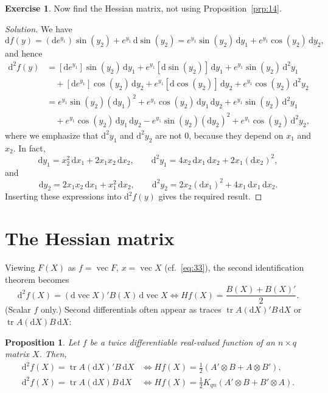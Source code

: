 \documentclass[14pt]{extarticle}
\theoremstyle{plain}
\newtheorem{proposition}{Proposition}
\theoremstyle{definition}
\newtheorem{exercise}{Exercise}
\theoremstyle{remark}
\newenvironment{solution}{%
  \begin{proof}[Solution]%
}{%
  \end{proof}%
}
\DeclareMathOperator{\tr}{tr}
\DeclareMathOperator{\avec}{vec}
\newcommand{\dd}{\mathrm{d}}
\begin{document}
\begin{exercise}\label{exer:27}
Now find the Hessian matrix, not using Proposition~\ref{prp:14}.
\end{exercise}

\begin{solution}
We have
\[
\dd f(y) = (\dd e^{y_1})\sin(y_2) + e^{y_1}\, \dd\sin(y_2) = e^{y_1}\sin(y_2)\, \dd y_1 + e^{y_1}\cos(y_2)\, \dd y_2,
\]
and hence
\begin{align*}
\dd^2 f(y) &= [\dd e^{y_1}]\sin(y_2)\, \dd y_1 + e^{y_1}[\dd\sin(y_2)]\, \dd y_1 + e^{y_1}\sin(y_2)\, \dd^2 y_1 \\
&\quad + [\dd e^{y_1}]\cos(y_2)\, \dd y_2 + e^{y_1}[\dd\cos(y_2)]\, \dd y_2 + e^{y_1}\cos(y_2)\, \dd^2 y_2 \\
&= e^{y_1}\sin(y_2)(\dd y_1)^2 + e^{y_1}\cos(y_2)\, \dd y_1\, \dd y_2 + e^{y_1}\sin(y_2)\, \dd^2 y_1 \\
&\quad + e^{y_1}\cos(y_2)\, \dd y_1\, \dd y_2 - e^{y_1}\sin(y_2)(\dd y_2)^2 + e^{y_1}\cos(y_2)\, \dd^2 y_2,
\end{align*}
where we emphasize that $\dd^2 y_1$ and $\dd^2 y_2$ are not $0$, because they depend on $x_1$ and $x_2$. In fact,
\[
\dd y_1 = x_2^2\, \dd x_1 + 2x_1 x_2\, \dd x_2, \qquad \dd^2 y_1 = 4x_2\, \dd x_1\, \dd x_2 + 2x_1(\dd x_2)^2,
\]
and
\[
\dd y_2 = 2x_1 x_2\, \dd x_1 + x_1^2\, \dd x_2, \qquad \dd^2 y_2 = 2x_2(\dd x_1)^2 + 4x_1\, \dd x_1\, \dd x_2.
\]
Inserting these expressions into $\dd^2 f(y)$ gives the required result.
\end{solution}

\section{The Hessian matrix}\label{sec:11}

Viewing $F(X)$ as $f = \avec F$, $x = \avec X$ (cf.~\eqref{eq:33}), the second identification theorem becomes
\begin{equation}\label{eq:42}
\dd^2 f(X) = (\dd\avec X)' B(X)\, \dd\avec X \iff Hf(X) = \frac{B(X) + B(X)'}{2}.
\end{equation}
(Scalar $f$ only.) Second differentials often appear as traces $\tr A(\dd X)'B\,\dd X$ or $\tr A(\dd X)B\,\dd X$:

\begin{proposition}\label{prp:15}
Let $f$ be a twice differentiable real-valued function of an $n \times q$ matrix $X$. Then,
\begin{align*}
\dd^2 f(X) = \tr A(\dd X)'B\, \dd X &\iff Hf(X) = \tfrac{1}{2}(A' \otimes B + A \otimes B'), \\
\dd^2 f(X) = \tr A(\dd X)B\, \dd X &\iff Hf(X) = \tfrac{1}{2} K_{qn}(A' \otimes B + B' \otimes A).
\end{align*}
\end{proposition}
\end{document}
